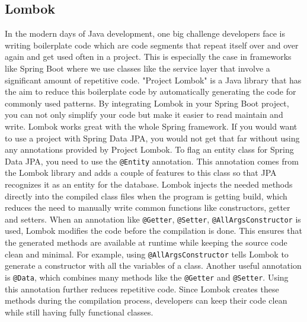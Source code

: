     \subsection{Lombok}
    In the modern days of Java development, one big challenge developers face is writing boilerplate code which are code segments that repeat itself over and over again and get used often in a project. This is especially the case in frameworks like Spring Boot where we use classes like the service layer that involve a significant amount of repetitive code.  \newline
    "Project Lombok" is a Java library that has the aim to reduce this boilerplate code by automatically generating the code for commonly used patterns. By integrating Lombok in your Spring Boot project, you can not only simplify your code but make it easier to read maintain and write. 
    Lombok works great with the whole Spring framework. If you would want to use a project with Spring Data JPA, you would not get that far without using any annotations provided by Project Lombok. To flag an entity class for Spring Data JPA, you need to use the \texttt{@Entity} annotation. This annotation comes from the Lombok library and adds a couple of 
    features to this class so that JPA recognizes it as an entity for the database. \newline
    Lombok injects the needed methods directly into the compiled class files when the program is getting build, which reduces the need to manually write common functions like constructors, getter and setters. When an annotation like \texttt{@Getter}, \texttt{@Setter}, \texttt{@AllArgsConstructor} is used, Lombok modifies the code before the compilation is done. This ensures that the generated methods are available at runtime while keeping the source code clean and minimal. \newline
    For example, using \texttt{@AllArgsConstructor} tells Lombok to generate a constructor with all the variables of a class. Another useful annotation is \texttt{@Data}, which combines many methods like the \texttt{@Getter} and \texttt{@Setter}. Using this annotation further reduces repetitive code. \newline
    Since Lombok creates these methods during the compilation process, developers can keep their code clean while still having fully functional classes. \Autocite{Andi:Lombok1, Andi:Lombok2, Andi:Lombok3}
    
